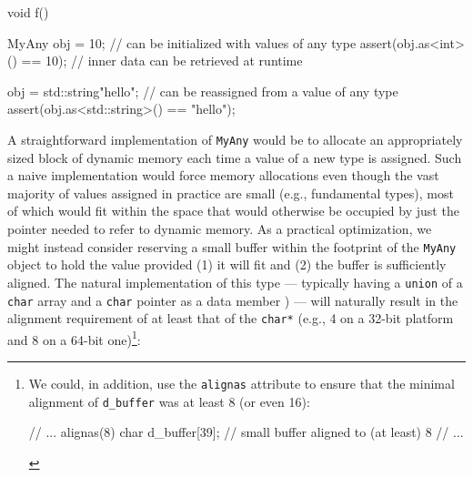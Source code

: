 \begin{emcppslisting}
void f()
{
    MyAny obj = 10;               // can be initialized with values of any type
    assert(obj.as<int>() == 10);  // inner data can be retrieved at runtime

    obj = std::string{"hello"};   // can be reassigned from a value of any type
    assert(obj.as<std::string>() == "hello");
}
\end{emcppslisting}

\noindent A straightforward implementation of \lstinline!MyAny! would be to allocate
an appropriately sized block of dynamic memory each time a value of a
new type is assigned. Such a naive implementation would force memory
allocations even though the vast majority of values assigned in practice
are small (e.g., fundamental types), most of which would fit within the
space that would otherwise be occupied by just the pointer needed to
refer to dynamic memory. As a practical optimization, we might instead
consider reserving a small buffer
  within the footprint of the
\lstinline!MyAny! object to hold the value provided (1) it will fit and (2)
the buffer is sufficiently aligned. The natural implementation of this
type --- typically having a \lstinline!union! of a \lstinline!char! array and a \lstinline!char! pointer as a data member ) --- will naturally result in the alignment requirement of at least that of the \lstinline!char*! (e.g., 4 on a 32-bit
platform and 8 on a 64-bit one){\cprotect\footnote{We could, in
  addition, use the \lstinline!alignas! attribute to ensure that
  the minimal alignment of \lstinline!d_buffer! was at least 8 (or even
  16):

  \begin{emcppslisting}[style=footcode]
  // ...
  alignas(8) char d_buffer[39];  // small buffer aligned to (at least) 8
  // ...
  \end{emcppslisting}
      }}:

